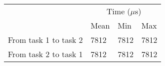 \begin{tabular}{llll}
  & \multicolumn{3}{c}{Time ($\mu$s)}          \\ \cline{2-4} 
  & \multicolumn{1}{c}{Mean} & Min  & Max  \\ \cline{2-4} 
From task 1 to task 2 & 7812                     & 7812 & 7812 \\
From task 2 to task 1 & 7812                     & 7812 & 7812
\end{tabular}